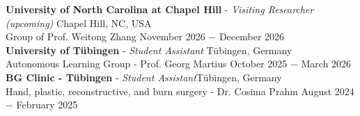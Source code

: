 \documentclass{article}
\begin{document}



\noindent \textbf{University of North Carolina at Chapel Hill} - \textit{Visiting Researcher (upcoming)} \hfill Chapel Hill, NC, USA \\
\noindent Group of Prof. Weitong Zhang \hfill November 2026 $-$ December 2026\\

\noindent \textbf{University of Tübingen} - \textit{Student Assistant} \hfill Tübingen, Germany \\
\noindent Autonomous Learning Group  - Prof. Georg Martius \hfill October 2025 $-$ March 2026\\

\noindent \textbf{BG Clinic - Tübingen}  - \textit{Student Assistant}\hfill Tübingen, Germany \\
\noindent Hand, plastic, reconstructive, and burn surgery - Dr. Cosima Prahm  \hfill August 2024 $-$ February 2025\\

% 
\end{document}
